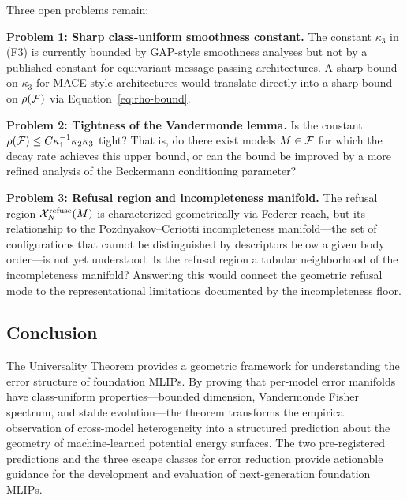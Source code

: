 Three open problems remain:

\textbf{Problem 1: Sharp class-uniform smoothness constant.} The constant $\kappa_3$ in (F3) is currently bounded by GAP-style smoothness analyses\cite{bigi2022smooth} but not by a published constant for equivariant-message-passing architectures. A sharp bound on $\kappa_3$ for MACE-style architectures would translate directly into a sharp bound on $\rho(\mathcal{F})$ via Equation~\eqref{eq:rho-bound}.

\textbf{Problem 2: Tightness of the Vandermonde lemma.} Is the constant $\rho(\mathcal{F}) \leq C \kappa_1^{-1} \kappa_2 \kappa_3$ tight? That is, do there exist models $M \in \mathcal{F}$ for which the decay rate achieves this upper bound, or can the bound be improved by a more refined analysis of the Beckermann conditioning parameter?

\textbf{Problem 3: Refusal region and incompleteness manifold.} The refusal region $\mathcal{X}_N^{\text{refuse}}(M)$ is characterized geometrically via Federer reach, but its relationship to the Pozdnyakov--Ceriotti incompleteness manifold\cite{pozdnyakov2020incompleteness}---the set of configurations that cannot be distinguished by descriptors below a given body order---is not yet understood. Is the refusal region a tubular neighborhood of the incompleteness manifold? Answering this would connect the geometric refusal mode to the representational limitations documented by the incompleteness floor.

\subsection{Conclusion}

The Universality Theorem provides a geometric framework for understanding the error structure of foundation MLIPs. By proving that per-model error manifolds have class-uniform properties---bounded dimension, Vandermonde Fisher spectrum, and stable evolution---the theorem transforms the empirical observation of cross-model heterogeneity into a structured prediction about the geometry of machine-learned potential energy surfaces. The two pre-registered predictions and the three escape classes for error reduction provide actionable guidance for the development and evaluation of next-generation foundation MLIPs.
